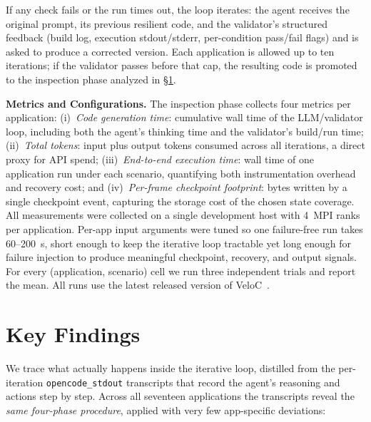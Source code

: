 \documentclass[conference]{IEEEtran}
\begin{document}
\noindent
If any check fails or the run times out, the loop iterates: the agent receives the original prompt, its previous resilient code, and the validator's structured feedback (build log, execution stdout/stderr, per-condition pass/fail flags) and is asked to produce a corrected version. Each application is allowed up to ten iterations; if the validator passes before that cap, the resulting code is promoted to the inspection phase analyzed in \S\ref{sec:findings}.


\medskip
\noindent\textbf{Metrics and Configurations.}
The inspection phase collects four metrics per application:
(i)~\emph{Code generation time}: cumulative wall time of the LLM/validator loop, including both the agent's thinking time and the validator's build/run time;
(ii)~\emph{Total tokens}: input plus output tokens consumed across all iterations, a direct proxy for API spend;
(iii)~\emph{End-to-end execution time}: wall time of one application run under each scenario, quantifying both instrumentation overhead and recovery cost; and
(iv)~\emph{Per-frame checkpoint footprint}: bytes written by a single checkpoint event, capturing the storage cost of the chosen state coverage.
All measurements were collected on a single development host with 4~MPI ranks per application. Per-app input arguments were tuned so one failure-free run takes 60--200~s, short enough to keep the iterative loop tractable yet long enough for failure injection to produce meaningful checkpoint, recovery, and output signals. For every (application, scenario) cell we run three independent trials and report the mean. All runs use the latest released version of VeloC~\cite{veloc}.


\section{Key Findings}
\label{sec:findings}



We trace what actually happens inside the iterative loop, distilled from the per-iteration \texttt{opencode\_stdout} transcripts that record the agent's reasoning and actions step by step. Across all seventeen applications the transcripts reveal the \emph{same four-phase procedure}, applied with very few app-specific deviations:
\end{document}
